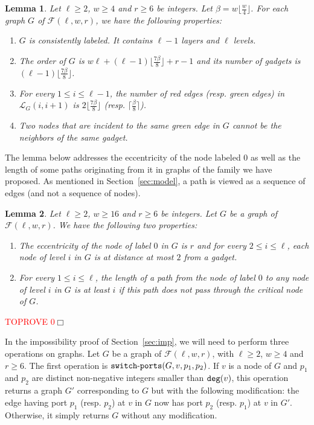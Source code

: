 \documentclass[11pt]{article}
\newtheorem{lemma}{Lemma}[section]
\newcommand{\qed}{\hfill $\Box$ \bigbreak}
\newenvironment{proof}{\noindent {\bf Proof.}}{\qed}
\begin{document}
\begin{lemma}
\label{lem:conse}
Let $\ell\geq 2$, $w\geq 4$ and $r\geq 6$ be integers. Let $\beta=w\lfloor\frac{w}{4}\rfloor$. For each graph $G$ of $\mathcal{F}(\ell,w,r)$, we have the following properties:
\begin{enumerate}
\item $G$ is consistently labeled. It contains $\ell-1$ layers and $\ell$ levels. 
\item The order of $G$ is $w\ell+ (\ell-1)\lfloor\frac{7\beta}{8}\rfloor+r-1$ and its number of gadgets is $(\ell-1)\lfloor\frac{7\beta}{8}\rfloor$.
\item For every $1\leq i \leq \ell-1$, the number of red edges (resp. green edges) in $\mathcal{L}_G(i,i+1)$ is $2\lfloor\frac{7\beta}{8}\rfloor$ (resp. $\lceil\frac{\beta}{8}\rceil$).
\item Two nodes that are incident to the same green edge in $G$ cannot be the neighbors of the same gadget.
\end{enumerate} 
\end{lemma}

The lemma below addresses the eccentricity of the node labeled $0$ as
well as the length of some paths originating from it in graphs of the
family we have proposed. As mentioned in Section~\ref{sec:model}, a path is viewed as a sequence of edges (and not a sequence of nodes).

\begin{lemma}
\label{lem:ecc}
Let $\ell\geq 2$, $w\geq 16$ and $r\geq 6$ be integers. Let $G$ be a graph of $\mathcal{F}(\ell,w,r)$. We have the following two properties:
\begin{enumerate}
\item The eccentricity of the node of label $0$ in $G$ is $r$ and for every $2\leq i\leq \ell$, each node of level $i$ in $G$ is at distance at most $2$ from a gadget.
\item For every $1\leq i\leq \ell$, the length of a path from the node of label $0$ to any node of level $i$ in $G$ is at least $i$ if this path does not pass through the critical node of $G$.
\end{enumerate}
\end{lemma}

\begin{proof}\textcolor{red}{TOPROVE 0}\end{proof}



In the impossibility proof of Section~\ref{sec:imp}, we will need to perform three operations on graphs. Let $G$ be a graph of $\mathcal{F}(\ell,w,r)$, with $\ell\geq 2$, $w\geq 4$ and $r\geq 6$. The first operation is ${\tt switch\mbox{-}ports}(G,v,p_1,p_2)$. If $v$ is a node of $G$ and $p_1$ and $p_2$ are distinct non-negative integers smaller than ${\tt deg}(v)$, this operation returns a graph $G'$ corresponding to $G$ but with the following modification: the edge having port $p_1$ (resp. $p_2$) at $v$ in $G$ now has port $p_2$ (resp. $p_1$) at $v$ in $G'$. Otherwise, it simply returns $G$ without any modification.
\end{document}
